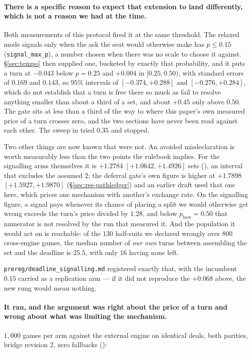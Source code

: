 \documentclass[11pt,letterpaper]{article}
\begin{document}
\paragraph{There is a specific reason to expect that extension to land
differently, which is not a reason we had at the time.} Both measurements of
this protocol fired it at the same threshold. The relaxed mode signals only
when the ask the seat would otherwise make has $p \leq 0.15$
(\texttt{signal\_max\_p}), a number chosen when there was no scale to choose it
against. \S\ref{sec:tempo} then supplied one, bucketed by exactly that
probability, and it puts a turn at $-0.043$ below $p = 0.25$ and $+0.004$ in
$[0.25, 0.50)$, with standard errors of $0.169$ and $0.143$, so $95\%$
intervals of $[-0.374, +0.288]$ and $[-0.276, +0.284]$, which do not establish
that a turn is free there so much as fail to resolve anything smaller than
about a third of a set, and about
$+0.45$ only above $0.50$. The gate sits at less than a third of the way to
where this paper's own measured price of a turn crosses zero, and the two
sections have never been read against each other. The sweep in
 tried $0.35$ and stopped.

Two other things are now known that were not. An avoided misdeclaration is
worth measurably less than the two points the rulebook implies. For the
signalling arms themselves it is $+1.2784$ $[+1.0642, +1.4926]$ sets
(), an interval that excludes the
assumed $2$; the deferral gate's own figure is higher at $+1.7898$
$[+1.5927, +1.9870]$ (\S\ref{sec:res-pathledger}) and an earlier draft used
that one here, which prices one mechanism with another's exchange rate. On the
signalling figure, a signal pays whenever its chance of placing a split we
would otherwise get wrong exceeds the turn's price divided by $1.28$, and
below $p_{\text{best}} = 0.50$ that numerator is not resolved by the run that
measured it. And the population it would act on
is reachable: of the $130$ half-suits we declared wrongly over $800$
cross-engine games, the median number of \emph{our own} turns between
assembling the set and the deadline is $25.5$, with only $16$ having none
left.

\texttt{prereg/deadline\_signalling.md} registered exactly that, with the
incumbent $0.15$ carried as a replication arm --- if it did not reproduce the
$+0.068$ above, the new rung would mean nothing.

\label{sec:res-signal}
\paragraph{It ran, and the argument was right about the price of a turn and
wrong about what was limiting the mechanism.} $1{,}000$ games per arm against
the external engine on identical deals, both parities, bridge revision 2, zero fallbacks
():
\end{document}
